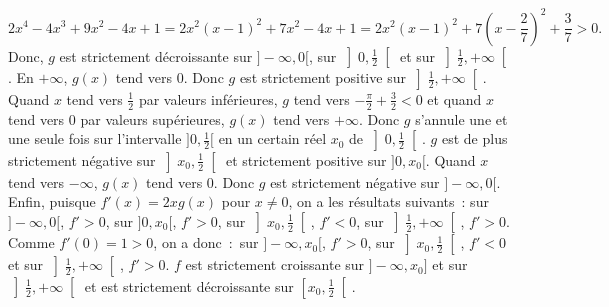 {\begin{enumerate}
{$$2x^4-4x^3+9x^2-4x+1=2x^2(x-1)^2+7x^2-4x+1=2x^2(x-1)^2+7\left(x-\frac{2}{7}\right)^2+\frac{3}{7}>0.$$
Donc, $g$ est
strictement décroissante sur $]-\infty,0[$, sur $\left]0,\frac{1}{2}\right[$ et sur $\left]\frac{1}{2},+\infty\right[$. En $+\infty$, $g(x)$
tend vers $0$. Donc $g$ est strictement positive sur $\left]\frac{1}{2},+\infty\right[$. Quand $x$ tend vers $\frac{1}{2}$ par
valeurs inférieures, $g$ tend vers $-\frac{\pi}{2}+\frac{3}{2}<0$ et quand $x$ tend vers $0$ par valeurs
supérieures, $g(x)$ tend vers $+\infty$. Donc $g$ s'annule une et une seule fois sur l'intervalle $]0,\frac{1}{2}[$ en
un certain réel $x_0$ de $\left]0,\frac{1}{2}\right[$. $g$ est de plus strictement négative sur $\left]x_0,\frac{1}{2}\right[$ 
et strictement positive sur $]0,x_0[$. Quand $x$ tend vers $-\infty$, $g(x)$ tend vers $0$. Donc $g$ est strictement
négative sur $]-\infty,0[$. Enfin, puisque $f'(x)=2xg(x)$ pour $x\neq0$, on a les résultats suivants~:
sur
$]-\infty,0[$, $f'> 0$, sur $]0,x_0[$, $f'> 0$, sur $\left]x_0,\frac{1}{2}\right[$, $f'< 0$, sur $\left]\frac{1}{2},+\infty\right[$, $f'>
0$. Comme $f'(0)=1>0$, on a donc~:~sur $]-\infty,x_0[$, $f'>0$,
sur $\left]x_0,\frac{1}{2}\right[$, $f'< 0$ et sur $\left]\frac{1}{2},+\infty\right[$, $f'> 0$. $f$ est strictement croissante sur
$]-\infty,x_0]$ et sur $\left]\frac{1}{2},+\infty\right[$ et est strictement décroissante sur $\left[x_0,\frac{1}{2}\right[$.}
\end{enumerate}
}